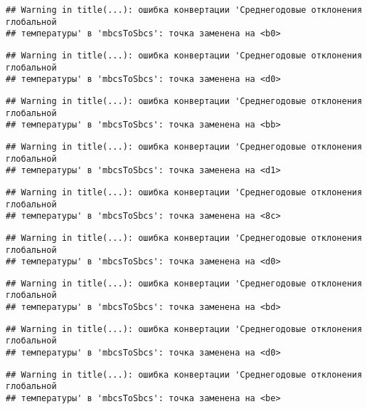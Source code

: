 \documentclass[
]{article}
\begin{document}
\begin{verbatim}
## Warning in title(...): ошибка конвертации 'Среднегодовые отклонения глобальной
## температуры' в 'mbcsToSbcs': точка заменена на <b0>
\end{verbatim}

\begin{verbatim}
## Warning in title(...): ошибка конвертации 'Среднегодовые отклонения глобальной
## температуры' в 'mbcsToSbcs': точка заменена на <d0>
\end{verbatim}

\begin{verbatim}
## Warning in title(...): ошибка конвертации 'Среднегодовые отклонения глобальной
## температуры' в 'mbcsToSbcs': точка заменена на <bb>
\end{verbatim}

\begin{verbatim}
## Warning in title(...): ошибка конвертации 'Среднегодовые отклонения глобальной
## температуры' в 'mbcsToSbcs': точка заменена на <d1>
\end{verbatim}

\begin{verbatim}
## Warning in title(...): ошибка конвертации 'Среднегодовые отклонения глобальной
## температуры' в 'mbcsToSbcs': точка заменена на <8c>
\end{verbatim}

\begin{verbatim}
## Warning in title(...): ошибка конвертации 'Среднегодовые отклонения глобальной
## температуры' в 'mbcsToSbcs': точка заменена на <d0>
\end{verbatim}

\begin{verbatim}
## Warning in title(...): ошибка конвертации 'Среднегодовые отклонения глобальной
## температуры' в 'mbcsToSbcs': точка заменена на <bd>
\end{verbatim}

\begin{verbatim}
## Warning in title(...): ошибка конвертации 'Среднегодовые отклонения глобальной
## температуры' в 'mbcsToSbcs': точка заменена на <d0>
\end{verbatim}

\begin{verbatim}
## Warning in title(...): ошибка конвертации 'Среднегодовые отклонения глобальной
## температуры' в 'mbcsToSbcs': точка заменена на <be>
\end{verbatim}
\end{document}
